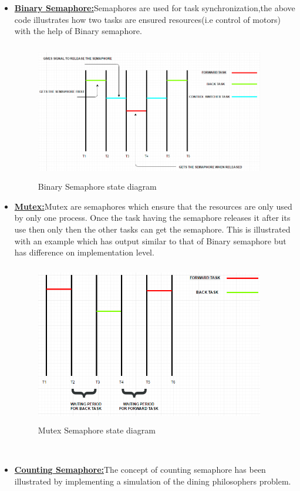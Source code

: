 \documentclass[a4paper,12pt,oneside]{book}
\begin{document}
\begin{itemize}
\item \textbf{\href{https://github.com/eYSIP-2016/RTOS_LPC2148/tree/master/Codes/Semaphore_Binary}
{Binary Semaphore:}}Semaphores are used for task synchronization,the above code illustrates how two tasks are ensured resources(i.e control of motors) with the help of Binary semaphore.
\begin{figure}[h]
\centering
\includegraphics[width=10cm,height=6cm]{Binary.PNG}
\caption{Binary Semaphore state diagram}
\end{figure}
\newpage
\item \textbf{\href{https://github.com/eYSIP-2016/RTOS_LPC2148/tree/master/Codes/Semaphore_mutex}{Mutex:}}Mutex are semaphores which ensure that the resources are only used by only one process. Once the task having the semaphore releases it after its use then only then the other tasks can get the semaphore. This is illustrated with an example which has output similar to that of Binary semaphore but has difference on implementation level.
\begin{figure}[h]
\centering
\includegraphics[width=10cm,height=7cm]{Mutex.PNG}
\caption{Mutex Semaphore state diagram}
\end{figure}

\\
\item \textbf{\href{https://github.com/eYSIP-2016/RTOS_LPC2148/tree/master/Codes/Semaphore_counting}{Counting Semaphore:}}The concept of counting semaphore has been illustrated by implementing a simulation of the dining philosophers problem.





\end{itemize}
\end{document}
